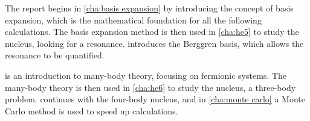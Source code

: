 

The report begins in \cref{cha:basis expansion} by introducing the concept of 
basis expansion, which is the mathematical foundation for all the
following calculations. The basis expansion method is then used in 
\cref{cha:he5} to study the  nucleus, looking for a resonance.
 introduces the Berggren basis, which
allows the resonance to be quantified.


 is an introduction to many-body theory, focusing 
on fermionic systems. The many-body theory is then used in \cref{cha:he6} 
to study the  nucleus, a three-body problem. 
continues with the four-body  nucleus, and in \cref{cha:monte carlo}
a Monte Carlo method is used to speed up calculations.
